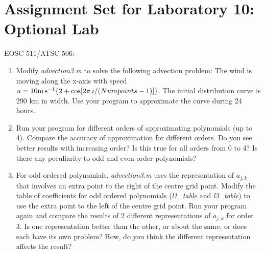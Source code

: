 \documentclass[12pt]{article}
\begin{document}
\section*{Assignment Set for Laboratory 10: Optional Lab}

EOSC 511/ATSC 506: 

 \begin{enumerate}
\item Modify {\em advection3.m} to solve the following advection problem:  The wind is moving along the x-axis with speed \\ $u = 10 {\rm m\,s}^{-1} \{2 + \cos[2 \pi\,i/(Numpoints-1)]\}$.  The initial distribution curve is 290 km in width.  Use your program to approximate the curve during 24 hours.

\item Run your program for different orders of approximating polynomials
(up to 4).
Compare the accuracy of approximation for different orders.
Do you see better results with increasing order? Is this true for all
orders from 0 to 4? Is there any peculiarity to odd and even order
polynomials?

\item For odd ordered polynomials, \textit{advection3.m} uses the representation
of $a_{j,k}$ that involves an
extra point to the right of the centre grid point. Modify the table
of coefficients for odd ordered polynomials (\textit{l1\_table} and
\textit{l3\_table}) to use the extra point to the left of the centre
grid point. Run your program again and compare the results of 2 different
representations of  $a_{j,k}$ for order 3. Is one representation better than the other, or about the same, or does each have its own problem? How, do you think
the different representation affects the result?  

\end{enumerate}
\end{document}
